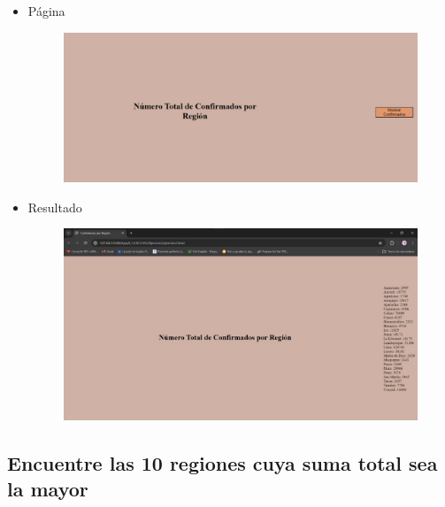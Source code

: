 \documentclass{article}
\begin{document}
\begin{itemize}
\begin{figure}[H]
		\end{figure}
		\item Página
		\begin{figure}[H]
			\centering
			\includegraphics[width=1.0\textwidth,keepaspectratio]{img/Ejer2T2Pagina.jpg}
		\end{figure}
		\item Resultado
		\begin{figure}[H]
			\centering
			\includegraphics[width=1.0\textwidth,keepaspectratio]{img/Ejer2T2Result.jpg}
		\end{figure}
	\end{itemize}

	\subsection{Encuentre las 10 regiones cuya suma total sea la mayor}
\end{document}
